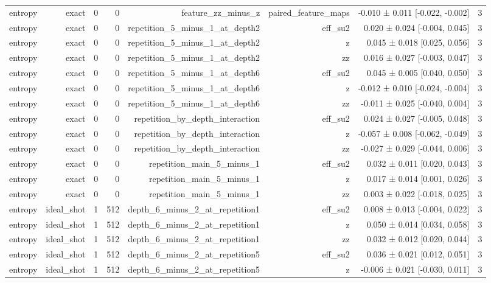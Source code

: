 \begin{table}
\begin{tabular}{lrrrrrrr}
entropy & exact & 0 & 0 & feature\_zz\_minus\_z & paired\_feature\_maps & -0.010 ± 0.011 [-0.022, -0.002] & 3 \\
entropy & exact & 0 & 0 & repetition\_5\_minus\_1\_at\_depth2 & eff\_su2 & 0.020 ± 0.024 [-0.004, 0.045] & 3 \\
entropy & exact & 0 & 0 & repetition\_5\_minus\_1\_at\_depth2 & z & 0.045 ± 0.018 [0.025, 0.056] & 3 \\
entropy & exact & 0 & 0 & repetition\_5\_minus\_1\_at\_depth2 & zz & 0.016 ± 0.027 [-0.003, 0.047] & 3 \\
entropy & exact & 0 & 0 & repetition\_5\_minus\_1\_at\_depth6 & eff\_su2 & 0.045 ± 0.005 [0.040, 0.050] & 3 \\
entropy & exact & 0 & 0 & repetition\_5\_minus\_1\_at\_depth6 & z & -0.012 ± 0.010 [-0.024, -0.004] & 3 \\
entropy & exact & 0 & 0 & repetition\_5\_minus\_1\_at\_depth6 & zz & -0.011 ± 0.025 [-0.040, 0.004] & 3 \\
entropy & exact & 0 & 0 & repetition\_by\_depth\_interaction & eff\_su2 & 0.024 ± 0.027 [-0.005, 0.048] & 3 \\
entropy & exact & 0 & 0 & repetition\_by\_depth\_interaction & z & -0.057 ± 0.008 [-0.062, -0.049] & 3 \\
entropy & exact & 0 & 0 & repetition\_by\_depth\_interaction & zz & -0.027 ± 0.029 [-0.044, 0.006] & 3 \\
entropy & exact & 0 & 0 & repetition\_main\_5\_minus\_1 & eff\_su2 & 0.032 ± 0.011 [0.020, 0.043] & 3 \\
entropy & exact & 0 & 0 & repetition\_main\_5\_minus\_1 & z & 0.017 ± 0.014 [0.001, 0.026] & 3 \\
entropy & exact & 0 & 0 & repetition\_main\_5\_minus\_1 & zz & 0.003 ± 0.022 [-0.018, 0.025] & 3 \\
entropy & ideal\_shot & 1 & 512 & depth\_6\_minus\_2\_at\_repetition1 & eff\_su2 & 0.008 ± 0.013 [-0.004, 0.022] & 3 \\
entropy & ideal\_shot & 1 & 512 & depth\_6\_minus\_2\_at\_repetition1 & z & 0.050 ± 0.014 [0.034, 0.058] & 3 \\
entropy & ideal\_shot & 1 & 512 & depth\_6\_minus\_2\_at\_repetition1 & zz & 0.032 ± 0.012 [0.020, 0.044] & 3 \\
entropy & ideal\_shot & 1 & 512 & depth\_6\_minus\_2\_at\_repetition5 & eff\_su2 & 0.036 ± 0.021 [0.012, 0.051] & 3 \\
entropy & ideal\_shot & 1 & 512 & depth\_6\_minus\_2\_at\_repetition5 & z & -0.006 ± 0.021 [-0.030, 0.011] & 3 \\

\end{tabular}
\end{table}
